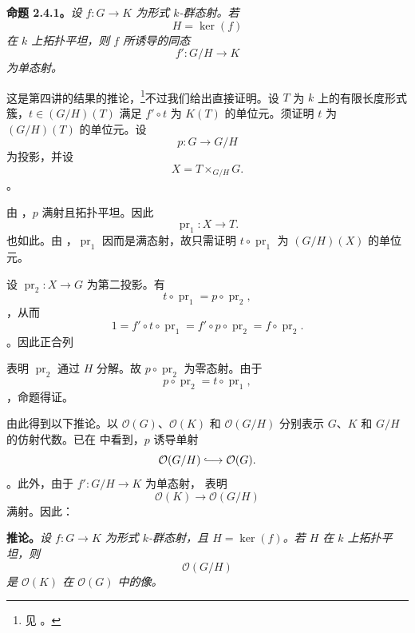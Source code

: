 \medskip\noindent\textbf{命题 2.4.1。} \label{sga3:VIIB:2.4.1}{\itshape 设 \(f:G\to K\) 为形式 \(k\)-群态射。若 \[
  H=\ker(f)
\] 在 \(k\) 上拓扑平坦，则 \(f\) 所诱导的同态 \[
  f':G/H\longrightarrow K
\] 为单态射。}

这是第四讲的结果的推论，\footnote{\label{sga3:VIIB:nde:93}见 。}不过我们给出直接证明。设 \(T\) 为 \(k\) 上的有限长度形式簇，\(t\in(G/H)(T)\) 满足 \(f'\circ t\) 为 \(K(T)\) 的单位元。须证明 \(t\) 为 \((G/H)(T)\) 的单位元。设 \[
  p:G\longrightarrow G/H
\] 为投影，并设 \[
  X=T\times_{G/H}G.
\]。

由 ，\(p\) 满射且拓扑平坦。因此 \[
  \operatorname{pr}_1:X\longrightarrow T.
\] 也如此。由 ，\(\operatorname{pr}_1\) 因而是满态射，故只需证明 \(t\circ\operatorname{pr}_1\) 为 \((G/H)(X)\) 的单位元。

设 \(\operatorname{pr}_2:X\to G\) 为第二投影。有 \[
  t\circ\operatorname{pr}_1
  =
  p\circ\operatorname{pr}_2,
\]，从而 \[
  1
  =
  f'\circ t\circ\operatorname{pr}_1
  =
  f'\circ p\circ\operatorname{pr}_2
  =
  f\circ\operatorname{pr}_2.
\]。因此正合列\begin{center} \label{sga3:VIIB:2.4.1:exact-sequence} \end{center}表明 \(\operatorname{pr}_2\) 通过 \(H\) 分解。故 \(p\circ\operatorname{pr}_2\) 为零态射。由于 \[
  p\circ\operatorname{pr}_2
  =
  t\circ\operatorname{pr}_1,
\]，命题得证。

由此得到以下推论。以 \(\mathcal O(G)\)、\(\mathcal O(K)\) 和 \(\mathcal O(G/H)\) 分别表示 \(G\)、\(K\) 和 \(G/H\) 的仿射代数。已在  中看到，\(p\) 诱导单射 \[
  \mathcal O(G/H)\lhook\joinrel\longrightarrow\mathcal O(G).
\]。此外，由于 \(f':G/H\to K\) 为单态射， 表明 \[
  \mathcal O(K)\longrightarrow\mathcal O(G/H)
\] 满射。因此：

\medskip\noindent\textbf{推论。} \label{sga3:VIIB:2.4.1:corollary}{\itshape 设 \(f:G\to K\) 为形式 \(k\)-群态射，且 \(H=\ker(f)\)。若 \(H\) 在 \(k\) 上拓扑平坦，则 \[
  \mathcal O(G/H)
\] 是 \(\mathcal O(K)\) 在 \(\mathcal O(G)\) 中的像。}
